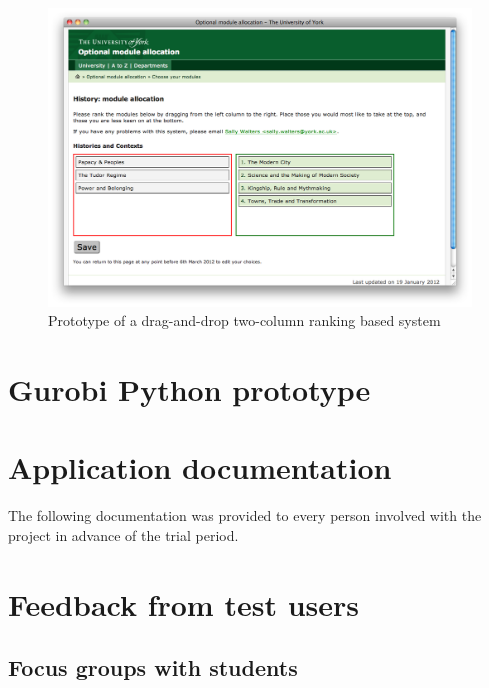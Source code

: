 \documentclass[draft]{scrartcl}
\begin{document}
\begin{figure}
  \begin{center}
    \includegraphics[width=0.85\linewidth]{images/prototypes/student_prototype_3.png}
  \end{center}
  \caption{Prototype of a drag-and-drop two-column ranking based system}
  \label{prototype_student_2col}
\end{figure}

\clearpage
\section{Gurobi Python prototype}
\label{sec:gurobipythonprototype}

\lstset{language=Python}


\clearpage
\section{Application documentation}
\label{sec:documentation}

The following documentation was provided to every person involved with the
project in advance of the trial period.



\clearpage
\section{Feedback from test users}
\label{sec:testingfeedback}

\subsection{Focus groups with students}
\end{document}
